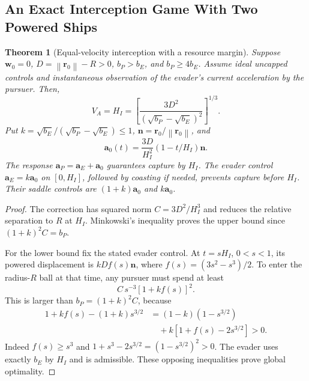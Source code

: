 \documentclass[journal,a4paper]{IEEEtran}
\newtheorem{theorem}{Theorem}
\newcommand{\norm}[1]{\left\|#1\right\|}
\begin{document}
\subsection{An Exact Interception Game With Two Powered Ships}
\begin{theorem}[Equal-velocity interception with a resource margin]
\label{thm:activeinterception}
Suppose $\mathbf w_0=0$, $D=\norm{\mathbf r_0}-R>0$, $b_P>b_E$, and $b_P\ge4b_E$. Assume ideal uncapped controls and instantaneous observation of the evader's current acceleration by the pursuer. Then,
\begin{equation}
 \boxed{V_A=H_I=\left[\frac{3D^2}
                  {(\sqrt{b_P}-\sqrt{b_E})^2}\right]^{1/3}.}
 \label{eq:activeIvalue}
\end{equation}
Put $k=\sqrt{b_E}/(\sqrt{b_P}-\sqrt{b_E})\le1$, $\mathbf n=\mathbf r_0/\norm{\mathbf r_0}$, and
\begin{equation}
 \mathbf a_0(t)=\frac{3D}{H_I^2}(1-t/H_I)\mathbf n.
 \label{eq:activeIcontrol}
\end{equation}
The response $\mathbf a_P=\mathbf a_E+\mathbf a_0$ guarantees capture by $H_I$. The evader control $\mathbf a_E=k\mathbf a_0$ on $[0,H_I]$, followed by coasting if needed, prevents capture before $H_I$. Their saddle controls are $(1+k)\mathbf a_0$ and $k\mathbf a_0$.
\end{theorem}
\begin{proof}
The correction has squared norm $C=3D^2/H_I^3$ and reduces the relative separation to $R$ at $H_I$. Minkowski's inequality proves the upper bound since $(1+k)^2C=b_P$.

For the lower bound fix the stated evader control. At $t=sH_I$, $0<s<1$, its powered displacement is $kDf(s)\mathbf n$, where $f(s)=(3s^2-s^3)/2$. To enter the radius-$R$ ball at that time, any pursuer must spend at least
\begin{equation}
 C\,s^{-3}[1+kf(s)]^2.
\end{equation}
This is larger than $b_P=(1+k)^2C$, because
\begin{align}
 1+kf(s)-(1+k)s^{3/2}
  &=(1-k)(1-s^{3/2})\nonumber\\
  &\quad+k[1+f(s)-2s^{3/2}]>0.
\end{align}
Indeed $f(s)\ge s^3$ and $1+s^3-2s^{3/2}=(1-s^{3/2})^2>0$. The evader uses exactly $b_E$ by $H_I$ and is admissible. These opposing inequalities prove global optimality.
\end{proof}
\end{document}
